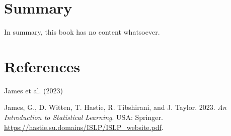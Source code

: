 \documentclass[
  letterpaper,
  DIV=11,
  numbers=noendperiod]{scrreprt}
\newlength{\cslhangindent}
\newenvironment{CSLReferences}[2] %
 {\begin{list}{}{%
  \setlength{\itemindent}{0pt}
  \setlength{\leftmargin}{0pt}
  \setlength{\parsep}{0pt}
  \ifodd #1
   \setlength{\leftmargin}{\cslhangindent}
   \setlength{\itemindent}{-1\cslhangindent}
  \fi
  \setlength{\itemsep}{#2\baselineskip}}}
 {\end{list}}
\begin{document}

\chapter{Summary}\label{summary}

In summary, this book has no content whatsoever.


\chapter*{References}\label{references}


James et al. (2023)

\label{refs}
\begin{CSLReferences}{1}{0}
James, G., D. Witten, T. Hastie, R. Tibshirani, and J. Taylor. 2023.
\emph{An Introduction to Statistical Learning}. USA: Springer.
\url{https://hastie.su.domains/ISLP/ISLP_website.pdf}.

\end{CSLReferences}
\end{document}

